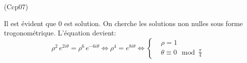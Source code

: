 \begin{tiny}(Ccp07)\end{tiny} \label{Ccp07} Il est évident que $0$ est solution. On cherche les solutions non nulles sous forme trogonométrique. L'équation devient:
\begin{displaymath}
  \rho^2\,e^{2i\theta} = \rho^6\, e^{-6i\theta}
  \Leftrightarrow\rho ^4 = e^{8i\theta}
  \Leftrightarrow 
\left\lbrace 
\begin{aligned}
  & \rho = 1 \\ &\theta \equiv 0 \mod \frac{\pi}{4}
\end{aligned}
\right. 
\end{displaymath}
